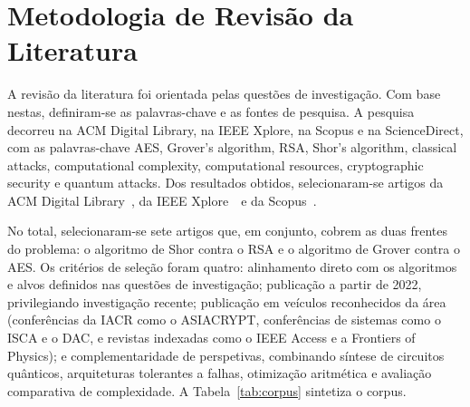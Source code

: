 \documentclass[11pt,a4paper]{article}
\begin{document}
\clearpage

\section{Metodologia de Revisão da Literatura}\label{sec:metodologia}

A revisão da literatura foi orientada pelas questões de investigação. Com base nestas, definiram-se as palavras-chave e as fontes de pesquisa. A pesquisa decorreu na ACM Digital Library, na IEEE Xplore, na Scopus e na ScienceDirect, com as palavras-chave AES, Grover’s algorithm, RSA, Shor’s algorithm, classical attacks, computational complexity, computational resources, cryptographic security e quantum attacks. Dos resultados obtidos, selecionaram-se artigos da ACM Digital Library~\cite{zhou2025,luongo2025}, da IEEE Xplore~\cite{oonishi2026,chethana2025}~e da Scopus~\cite{huang2022,liu2023, wang2022}.

No total, selecionaram-se sete artigos que, em conjunto, cobrem as duas frentes do problema: o algoritmo de Shor contra o RSA e o algoritmo de Grover contra o AES. Os critérios de seleção foram quatro: alinhamento direto com os algoritmos e alvos definidos nas questões de investigação; publicação a partir de 2022, privilegiando investigação recente; publicação em veículos reconhecidos da área (conferências da IACR como o ASIACRYPT, conferências de sistemas como o ISCA e o DAC, e revistas indexadas como o IEEE Access e a Frontiers of Physics); e complementaridade de perspetivas, combinando síntese de circuitos quânticos, arquiteturas tolerantes a falhas, otimização aritmética e avaliação comparativa de complexidade. A Tabela~\ref{tab:corpus} sintetiza o corpus.
\end{document}
